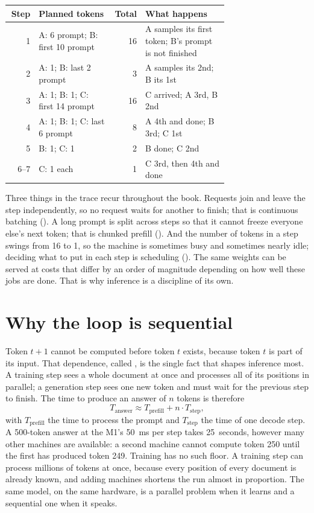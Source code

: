 \begin{center}\small
\begin{tabular}{@{}r>{\raggedright\arraybackslash}p{0.34\linewidth}r>{\raggedright\arraybackslash}p{0.38\linewidth}@{}}
\toprule
Step & Planned tokens & Total & What happens \\
\midrule
1 & A: 6 prompt; B: first 10 prompt & 16 & A samples its first token; B's prompt is not finished \\
2 & A: 1; B: last 2 prompt & 3 & A samples its 2nd; B its 1st \\
3 & A: 1; B: 1; C: first 14 prompt & 16 & C arrived; A 3rd, B 2nd \\
4 & A: 1; B: 1; C: last 6 prompt & 8 & A 4th and done; B 3rd; C 1st \\
5 & B: 1; C: 1 & 2 & B done; C 2nd \\
6--7 & C: 1 each & 1 & C 3rd, then 4th and done \\
\bottomrule
\end{tabular}
\end{center}

\noindent Three things in the trace recur throughout the book. Requests join and
leave the step independently, so no request waits for another to finish; that is
continuous batching (). A long prompt is split
across steps so that it cannot freeze everyone else's next token; that is
chunked prefill (). And the number of tokens in a step
swings from 16 to 1, so the machine is sometimes busy and sometimes nearly idle;
deciding what to put in each step is scheduling (). The same
weights can be served at costs that differ by an order of magnitude depending
on how well these jobs are done. That is why inference is a discipline of its
own.

\section{Why the loop is sequential}

Token $t + 1$ cannot be computed before token $t$ exists, because token $t$ is
part of its input. That dependence, called , is the
single fact that shapes inference most. A training step sees a whole document
at once and processes all of its positions in parallel; a generation step sees
one new token and must wait for the previous step to finish. The time to
produce an answer of $n$ tokens is therefore
\begin{equation}
T_{\text{answer}} \approx T_{\text{prefill}} + n \cdot T_{\text{step}},
\label{eq:answer-time}
\end{equation}
with $T_{\text{prefill}}$ the time to process the prompt and $T_{\text{step}}$
the time of one decode step. A 500-token answer at the M1's 50~ms per step
takes 25~seconds, however many other machines are available: a second machine
cannot compute token 250 until the first has produced token 249. Training has no
such floor. A training step can process millions of tokens at once, because
every position of every document is already known, and adding machines shortens
the run almost in proportion. The same model, on the same hardware, is a
parallel problem when it learns and a sequential one when it speaks.

